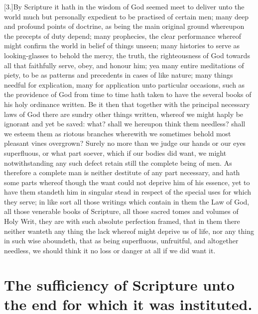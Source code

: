 [3.]By Scripture it hath in the wisdom of God seemed meet to deliver unto the world much but personally expedient to be practised of certain men; many deep and profound points of doctrine, as being the main original ground whereupon the precepts of duty depend; many prophecies, the clear performance whereof might confirm the world in belief of things unseen; many histories to serve as looking-glasses to behold the mercy, the truth, the righteousness of God towards all that faithfully serve, obey, and honour him; yea many entire meditations of piety, to be as patterns and precedents in cases of like nature; many things needful for explication, many for application unto particular occasions, such as the providence of God from time to time hath taken to have the several books of his holy ordinance written. Be it then that together with the principal necessary laws of God there are sundry other things written, whereof we might haply be ignorant and yet be saved: what? shall we hereupon think them needless? shall we esteem them as riotous branches wherewith we sometimes behold most pleasant vines overgrown? Surely no more than we judge our hands or our eyes superfluous, or what part soever, which if our bodies did want, we might notwithstanding any such defect retain still the complete being of men. As therefore a complete  man is neither destitute of any part necessary, and hath some parts whereof though the want could not deprive him of his essence, yet to have them standeth him in singular stead in respect of the special uses for which they serve; in like sort all those writings which contain in them the Law of God, all those venerable books of Scripture, all those sacred tomes and volumes of Holy Writ, they are with such absolute perfection framed, that in them there neither wanteth any thing the lack whereof might deprive us of life, nor any thing in such wise aboundeth, that as being superfluous, unfruitful, and altogether needless, we should think it no loss or danger at all if we did want it.

\section*{The sufficiency of Scripture unto the end for which it was instituted.}

